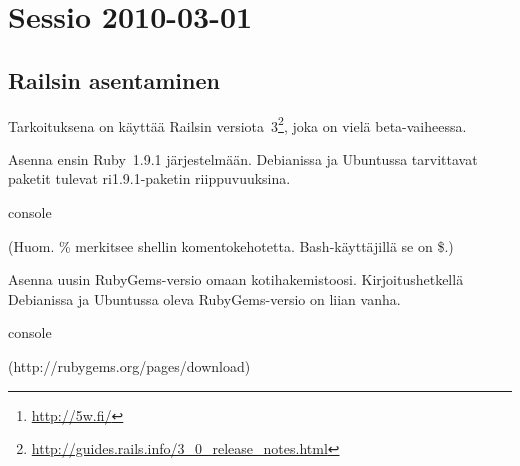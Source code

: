 \documentclass{article}
\title{\eng{5w Ruby on Rails workshop}}
\author{Johan Kiviniemi}
\begin{document}
\maketitle

\begin{abstract}
Jotain dokumentaationtynkää 5w:n\footnote{\url{http://5w.fi/}}, Tampereen
hackerspacen, Rails-opiskeluprojektista.
\end{abstract}

\tableofcontents

\section{Sessio 2010-03-01}

\subsection{Railsin asentaminen}

\begin{samepage}
Tarkoituksena on käyttää Railsin
versiota~3\footnote{\url{http://guides.rails.info/3\_0\_release\_notes.html}},
joka on vielä beta-vaiheessa.

Asenna ensin Ruby~1.9.1 järjestelmään. Debianissa ja Ubuntussa tarvittavat
paketit tulevat ri1.9.1-paketin riippuvuuksina.

\begin{pygmented}{console}
\end{pygmented}

(Huom. \% merkitsee shellin komentokehotetta. Bash-käyttäjillä se on \$.)
\end{samepage}

\begin{samepage}
Asenna uusin RubyGems-versio omaan kotihakemistoosi. Kirjoitushetkellä
Debianissa ja Ubuntussa oleva RubyGems-versio on liian vanha.

\begin{pygmented}{console}

(http://rubygems.org/pages/download)



\end{pygmented}
\end{samepage}
\end{document}
